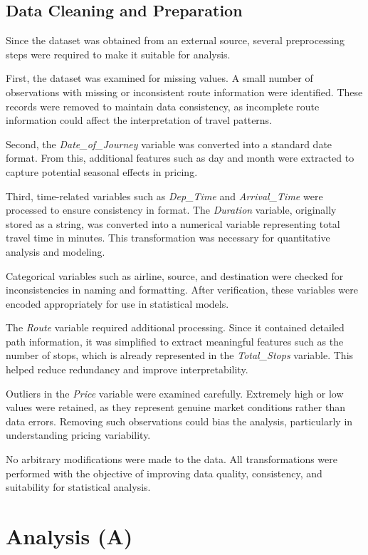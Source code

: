 \documentclass[12pt]{article}
\begin{document}
\subsection{Data Cleaning and Preparation}

Since the dataset was obtained from an external source, several preprocessing steps were required to make it suitable for analysis.

First, the dataset was examined for missing values. A small number of observations with missing or inconsistent route information were identified. These records were removed to maintain data consistency, as incomplete route information could affect the interpretation of travel patterns.

Second, the \textit{Date\_of\_Journey} variable was converted into a standard date format. From this, additional features such as day and month were extracted to capture potential seasonal effects in pricing.

Third, time-related variables such as \textit{Dep\_Time} and \textit{Arrival\_Time} were processed to ensure consistency in format. The \textit{Duration} variable, originally stored as a string, was converted into a numerical variable representing total travel time in minutes. This transformation was necessary for quantitative analysis and modeling.

Categorical variables such as airline, source, and destination were checked for inconsistencies in naming and formatting. After verification, these variables were encoded appropriately for use in statistical models.

The \textit{Route} variable required additional processing. Since it contained detailed path information, it was simplified to extract meaningful features such as the number of stops, which is already represented in the \textit{Total\_Stops} variable. This helped reduce redundancy and improve interpretability.

Outliers in the \textit{Price} variable were examined carefully. Extremely high or low values were retained, as they represent genuine market conditions rather than data errors. Removing such observations could bias the analysis, particularly in understanding pricing variability.

No arbitrary modifications were made to the data. All transformations were performed with the objective of improving data quality, consistency, and suitability for statistical analysis.

\section{Analysis (A)}
\end{document}
